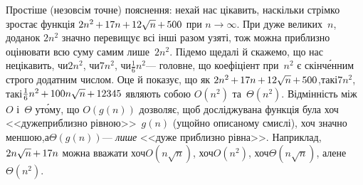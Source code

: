 \documentclass[14pt,a4paper]{extarticle}
\def\dib#1{\,#1\discretionary{}{\mbox{$#1$}}{}\,}
\begin{document}
Простіше (не\nolinebreak[2] зовсім точне) пояснення: нехай нас цікавить, наскільки стрімко зростає функція $2n^2\dib{{+}}17n\dib{{+}}12\sqrt{n}\dib{{+}}500$ при $n{\to}\infty$. При дуже великих~$n$, доданок $2n^2$ значно перевищує всі інші разом узяті, тож можна приблизно оцінювати всю суму самим лише~$2n^2$. Підемо ще\nolinebreak[2] далі й скажемо, що нас не\nolinebreak[3] цікавить, 
чи\nolinebreak[3] $2n^2$,
чи\nolinebreak[3] $7n^2$,
чи\nolinebreak[3] $\frac{1}{6}n^2$\nolinebreak[3] --- головне, що коефіціент при~$n^2$ є скінч\'{е}нним строго додатним числом. Оце й показує, що як $2n^2\dib{{+}}17n\dib{{+}}12\sqrt{n}\dib{{+}}500$,\linebreak[1]
так\nolinebreak[2] і\nolinebreak[1] $7n^2$,
так\nolinebreak[2] і\nolinebreak[1] $\frac{1}{6}n^2\dib{{+}}100n\sqrt{n}\dib{{+}}12345$
являють собою $O(n^2)$ та~$\Theta(n^2)$.
Відмінність між $O$ і~$\Theta$ у\nolinebreak[3] т\'{о}му, що $O(g(n))$ дозволяє, щоб досліджувана функція була хоч <<дуже\nolinebreak[2] приблизно рівною>>~$g(n)$ (у\nolinebreak[3] щойно описаному смислі), хоч значно меншою,\linebreak[1] а\nolinebreak[1] $\Theta(g(n))$\nolinebreak[3] --- \emph{лише} <<дуже приблизно рівна>>. Наприклад, $2n\sqrt{n}\dib{{+}}17n$ можна вважати хоч\nolinebreak[2] ${O(n\sqrt{n})}$, хоч\nolinebreak[2] ${O(n^2)}$, хоч\nolinebreak[2] ${\Theta(n\sqrt{n})}$, але\nolinebreak[2] не\nolinebreak[2] ${\Theta(n^2)}$.
\end{document}
